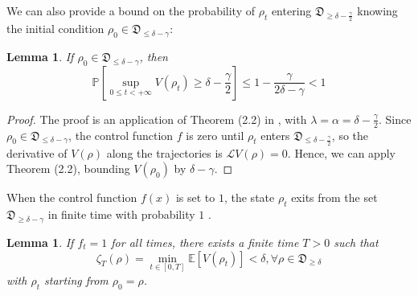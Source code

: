\documentclass[conference]{IEEEtran}
\theoremstyle{plain}
\theoremstyle{plain}
\theoremstyle{plain}
\newtheorem{lem}[theorem]{Lemma}
\theoremstyle{plain}
\theoremstyle{remark}
\theoremstyle{definition}
\begin{document}
We can also provide a bound on the probability of $\rho_t$ entering $\mathfrak D_{\ge \delta - \frac{\gamma}{2}}$ knowing the initial condition $\rho_0\in\mathfrak D_{\le \delta - \gamma}$: \begin{lem}
    If $\rho_0 \in \mathfrak D_{\le \delta - \gamma}$, then \begin{equation}
        \mathbb P\left[\sup_{0 \le t < +\infty} V(\rho_t) \ge \delta - \frac{\gamma}{2}\right] \le 1 - \frac{\gamma}{2\delta - \gamma} < 1
    \end{equation}
    \label{upboundprob}
\end{lem}
\begin{proof}
    The proof is an application of Theorem (2.2) in \cite{mirrahimi}, with $\lambda = \alpha = \delta - \frac{\gamma}{2}$. Since $\rho_0 \in \mathfrak D_{\le \delta - \gamma}$, the control function $f$ is zero until $\rho_t$ enters $\mathfrak D_{\le \delta - \frac{\gamma}{2}}$, so the derivative of $V(\rho)$ along the trajectories is $\mathscr L V(\rho) = 0$. Hence, we can apply Theorem (2.2), bounding $V(\rho_0)$ by $\delta - \gamma$.
\end{proof}

When the control function $f(x)$ is set to $1$, the state $\rho_t$ exits from the set $\mathfrak D_{\ge \delta - \gamma}$ in finite time with probability $1$ .
\begin{lem}
    If $f_t = 1$ for all times, there exists a finite time $T > 0$ such that \begin{equation}
        \zeta_T(\rho) = \min_{t \in [0, T]}\mathbb E[V(\rho_t)] < \delta, \forall \rho \in \mathfrak D_{\ge \delta} \label{zetafn}
    \end{equation}
    with $\rho_t$ starting from $\rho_0 = \rho$.
    \label{Texists}
\end{lem}
\end{document}
